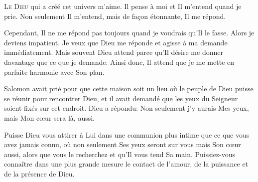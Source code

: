 \dvrule






\lettrine{L}{e Dieu} qui a créé cet univers m'aime.
 Il pense à moi et Il m'entend quand je prie.
 Non seulement Il m'entend, mais de fa\c{c}on étonnante, Il me répond.

Cependant, Il ne me répond pas toujours quand je voudrais qu'Il le fasse.
 Alors je deviens impatient. Je veux que Dieu me réponde
 et agisse à ma demande immédiatement.
 Mais souvent Dieu attend parce qu'Il désire me donner davantage
 que ce que je demande.
 Ainsi donc, Il attend que je me mette en parfaite harmonie avec Son plan. 

Salomon avait prié pour que cette maison soit un lieu où le peuple de Dieu
 puisse se réunir pour rencontrer Dieu, et il avait demandé
 que les yeux du Seigneur soient fixés sur cet endroit.
 Dieu a répondu:
 \Og Non seulement j'y aurais Mes yeux,
 mais Mon c\oe{}ur sera là, aussi. \Fg{}


Puisse Dieu vous attirer à Lui dans une communion plus intime
 que ce que vous avez jamais connu, où non seulement Ses yeux seront sur vous
 mais Son c\oe{}ur aussi, alors que vous le recherchez
 et qu'Il vous tend Sa main.
 Puissiez-vous connaître dans une plus grande mesure le contact de l'amour,
 de la puissance et de la présence de Dieu. 

\dvrule




